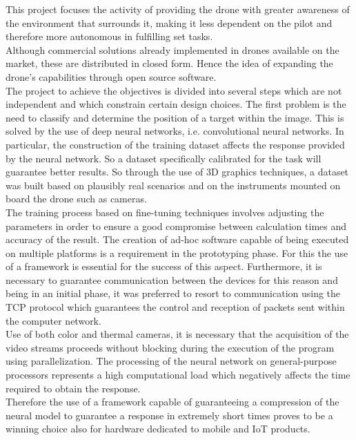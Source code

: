 \noindent This project focuses the activity of providing the drone with greater 
awareness of the environment that surrounds it, making it less dependent on the 
pilot and therefore more autonomous in fulfilling set tasks.\\
Although commercial solutions already implemented in drones available on the 
market, these are distributed in closed form.
Hence the idea of expanding the drone's capabilities through open source 
software.\\
The project to achieve the objectives is divided into several steps which are 
not independent and which constrain certain design choices.
The first problem is the need to classify and determine the position of a target
within the image. This is solved by the use of deep neural networks,
i.e. convolutional neural networks.
In particular, the construction of the training dataset affects the response 
provided by the neural network. 
So a dataset specifically calibrated for the task will guarantee better results.
So through the use of 3D graphics techniques, a dataset was built based on
plausibly real scenarios and on the instruments mounted on board the drone such
as cameras.\\
The training process based on fine-tuning techniques involves adjusting the
parameters in order to ensure a good compromise between calculation times and
accuracy of the result.
The creation of ad-hoc software capable of being executed on multiple platforms
is a requirement in the prototyping phase. For this the use of a framework is
essential for the success of this aspect.
Furthermore, it is necessary to guarantee communication between the devices for
this reason and being in an initial phase, it was preferred to resort to
communication using the TCP protocol which guarantees the control and reception
of packets sent within the computer network.\\ 
Use of both color and thermal cameras, it is necessary that the acquisition of 
the video streams proceeds without blocking during the execution of the program 
using parallelization.
The processing of the neural network on general-purpose processors represents a
high computational load which negatively affects the time required to obtain the
response.\\
Therefore the use of a framework capable of guaranteeing a compression of the
neural model to guarantee a response in extremely short times proves to be a
winning choice also for hardware dedicated to mobile and IoT products.\\

